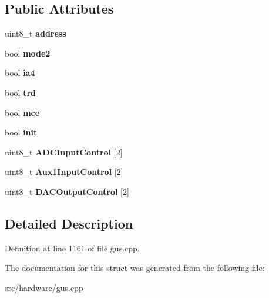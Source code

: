 \subsection*{Public Attributes}
\begin{DoxyCompactItemize}
\item 
\hypertarget{structgus__cs4231_a854196e166728ab338bd4dc1825e5376}{uint8\-\_\-t {\bfseries address}}\label{structgus__cs4231_a854196e166728ab338bd4dc1825e5376}

\item 
\hypertarget{structgus__cs4231_a1a0f1c8241e22df8912de936d6dd36a2}{bool {\bfseries mode2}}\label{structgus__cs4231_a1a0f1c8241e22df8912de936d6dd36a2}

\item 
\hypertarget{structgus__cs4231_ac856e0ff138f97283412af3a660ae48f}{bool {\bfseries ia4}}\label{structgus__cs4231_ac856e0ff138f97283412af3a660ae48f}

\item 
\hypertarget{structgus__cs4231_a98abeed198155481a7acbf4816affc16}{bool {\bfseries trd}}\label{structgus__cs4231_a98abeed198155481a7acbf4816affc16}

\item 
\hypertarget{structgus__cs4231_a6fc11df0fe6de72eaac011a4eaeb506e}{bool {\bfseries mce}}\label{structgus__cs4231_a6fc11df0fe6de72eaac011a4eaeb506e}

\item 
\hypertarget{structgus__cs4231_a1e1427d7fdd2d24972074cd552ea1e1f}{bool {\bfseries init}}\label{structgus__cs4231_a1e1427d7fdd2d24972074cd552ea1e1f}

\item 
\hypertarget{structgus__cs4231_a555b8f8e51d7a01912a32d399e50e264}{uint8\-\_\-t {\bfseries A\-D\-C\-Input\-Control} \mbox{[}2\mbox{]}}\label{structgus__cs4231_a555b8f8e51d7a01912a32d399e50e264}

\item 
\hypertarget{structgus__cs4231_ac5339efcc287958ad556d9fc7a590876}{uint8\-\_\-t {\bfseries Aux1\-Input\-Control} \mbox{[}2\mbox{]}}\label{structgus__cs4231_ac5339efcc287958ad556d9fc7a590876}

\item 
\hypertarget{structgus__cs4231_aecf705a077583ef50851864d5dd7ef53}{uint8\-\_\-t {\bfseries D\-A\-C\-Output\-Control} \mbox{[}2\mbox{]}}\label{structgus__cs4231_aecf705a077583ef50851864d5dd7ef53}

\end{DoxyCompactItemize}


\subsection{Detailed Description}


Definition at line 1161 of file gus.\-cpp.



The documentation for this struct was generated from the following file\-:\begin{DoxyCompactItemize}
\item 
src/hardware/gus.\-cpp\end{DoxyCompactItemize}
